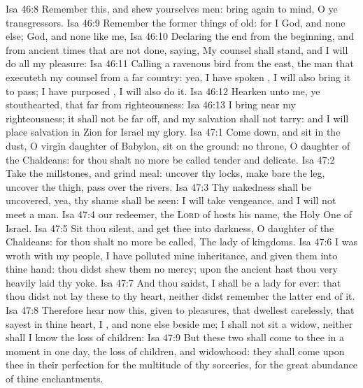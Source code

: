 \vs Isa 46:8 Remember this, and shew yourselves men: bring  again to mind, O ye transgressors.
\vs Isa 46:9 Remember the former things of old: for I  God, and  none else;  God, and  none like me,
\vs Isa 46:10 Declaring the end from the beginning, and from ancient times  that are not  done, saying, My counsel shall stand, and I will do all my pleasure:
\vs Isa 46:11 Calling a ravenous bird from the east, the man that executeth my counsel from a far country: yea, I have spoken , I will also bring it to pass; I have purposed , I will also do it.
\vs Isa 46:12 Hearken unto me, ye stouthearted, that  far from righteousness:
\vs Isa 46:13 I bring near my righteousness; it shall not be far off, and my salvation shall not tarry: and I will place salvation in Zion for Israel my glory.
\vs Isa 47:1 Come down, and sit in the dust, O virgin daughter of Babylon, sit on the ground:  no throne, O daughter of the Chaldeans: for thou shalt no more be called tender and delicate.
\vs Isa 47:2 Take the millstones, and grind meal: uncover thy locks, make bare the leg, uncover the thigh, pass over the rivers.
\vs Isa 47:3 Thy nakedness shall be uncovered, yea, thy shame shall be seen: I will take vengeance, and I will not meet  a man.
\vs Isa 47:4  our redeemer, the \textsc{Lord} of hosts  his name, the Holy One of Israel.
\vs Isa 47:5 Sit thou silent, and get thee into darkness, O daughter of the Chaldeans: for thou shalt no more be called, The lady of kingdoms.
\vs Isa 47:6 I was wroth with my people, I have polluted mine inheritance, and given them into thine hand: thou didst shew them no mercy; upon the ancient hast thou very heavily laid thy yoke.
\vs Isa 47:7 And thou saidst, I shall be a lady for ever:  that thou didst not lay these  to thy heart, neither didst remember the latter end of it.
\vs Isa 47:8 Therefore hear now this,  given to pleasures, that dwellest carelessly, that sayest in thine heart, I , and none else beside me; I shall not sit  a widow, neither shall I know the loss of children:
\vs Isa 47:9 But these two  shall come to thee in a moment in one day, the loss of children, and widowhood: they shall come upon thee in their perfection for the multitude of thy sorceries,  for the great abundance of thine enchantments.
